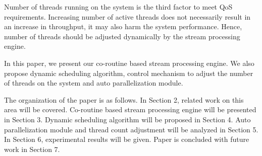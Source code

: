 Number of threads running on the system is the third factor to meet QoS requirements. Increasing number of active threads does not necessarily result in an increase in throughput, it may also harm the system performance. Hence, number of threads should be adjusted dynamically by the stream processing engine.

In this paper, we present our co-routine based stream processing engine. We also propose dynamic scheduling algorithm, control mechanism to adjust the number of threads on the system and auto parallelization module. 

The organization of the paper is as follows. In Section 2, related work on this area will be covered. Co-routine based stream processing engine will be presented in Section 3. Dynamic scheduling algorithm will be proposed in Section 4. Auto parallelization module and thread count adjustment will be analyzed in Section 5. In Section 6, experimental results will be given. Paper is concluded with future work in Section 7.